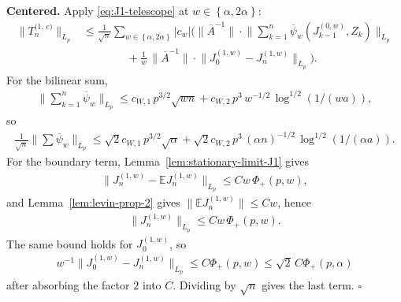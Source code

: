 \textbf{Centered.} Apply \eqref{eq:J1-telescope} at \(w \in \left\{\alpha, 2 \alpha\right\}\):
\begin{equation}
\begin{aligned}
\lVert  T_n^{\text{(1, c)}}  \rVert_{L_p}
  &\le \frac{1}{\sqrt{n}} \sum_{w \in \left\{\alpha, 2 \alpha\right\}} |c_w| \Biggl(
       \lVert  \overline{A}^{-1}  \rVert \cdot
       \lVert  \sum_{k = 1}^n \overline{\psi}_w (J_{k - 1}^{(0, w)}, Z_k)  \rVert_{L_p} \\
    &\quad \quad \quad \quad
       + \frac{1}{w} \, \lVert  \overline{A}^{-1}  \rVert \cdot
         \lVert  J_0^{(1, w)} - J_n^{(1, w)}  \rVert_{L_p}
     \Biggr).
\end{aligned}
\end{equation}
For the bilinear sum,
\begin{equation}
\begin{aligned}
\lVert  \sum_{k = 1}^n \overline{\psi}_w  \rVert_{L_p}
  \le c_{W, 1} \, p^{3 / 2} \sqrt{w n}
   + c_{W, 2} \, p^3 \, w^{-1 / 2} \, \log^{1 / 2}(1 / (w a)),
\end{aligned}
\end{equation}
so
\begin{equation}
\begin{aligned}
\frac{1}{\sqrt{n}} \lVert  \sum \overline{\psi}_w  \rVert_{L_p}
  \le \sqrt{2} c_{W, 1} \, p^{3 / 2} \sqrt{\alpha}
   + \sqrt{2} c_{W, 2} \, p^3 \, (\alpha n)^{-1 / 2} \, \log^{1 / 2}(1 / (\alpha a)).
\end{aligned}
\end{equation}
For the boundary term, Lemma~\ref{lem:stationary-limit-J1} gives
\begin{equation}
\begin{aligned}
\lVert  J_n^{(1, w)} - \mathbb{E} J_n^{(1, w)}  \rVert_{L_p} \le C w \, \Phi_+(p, w),
\end{aligned}
\end{equation}
and Lemma~\ref{lem:levin-prop-2} gives \(\lVert  \mathbb{E} J_n^{(1, w)}  \rVert \le C w\), hence
\begin{equation}
\begin{aligned}
\lVert  J_n^{(1, w)}  \rVert_{L_p} \le C w \, \Phi_+(p, w).
\end{aligned}
\end{equation}
The same bound holds for \(J_0^{(1, w)}\), so
\begin{equation}
\begin{aligned}
w^{-1}\lVert J_0^{(1,w)}-J_n^{(1,w)}\rVert_{L_p}
  \le C\Phi_+(p,w) \le \sqrt{2}\,C\Phi_+(p,\alpha)
\end{aligned}
\end{equation}
after absorbing
the factor \(2\) into \(C\).
Dividing by \(\sqrt{n}\) gives the last term. \(\square\)

